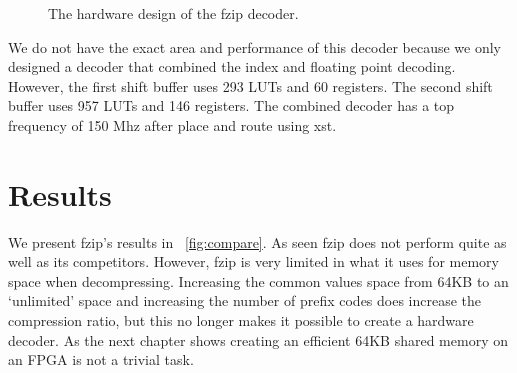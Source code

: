 \begin{figure}
    \caption{The hardware design of the fzip decoder.}
    \label{fig:fzip_decoder}
\end{figure}

We do not have the exact area and performance of this decoder because we only designed a decoder that combined the index and floating point decoding. However, the first shift buffer uses 293 LUTs and 60 registers. The second shift buffer uses 957 LUTs and 146 registers. The combined decoder has a top frequency of 150 Mhz after place and route using xst.
\section{Results}
\label{sec:fzipdiscussion}
We present fzip's results in \figurename~\ref{fig:compare}. As seen fzip does not perform quite as well as its competitors. However, fzip is very limited in what it uses for memory space when decompressing. Increasing the common values space from 64KB to an `unlimited' space and increasing the number of prefix codes does increase the compression ratio, but this no longer makes it possible to create a hardware decoder. As the next chapter shows creating an efficient 64KB shared memory on an FPGA is not a trivial task.
